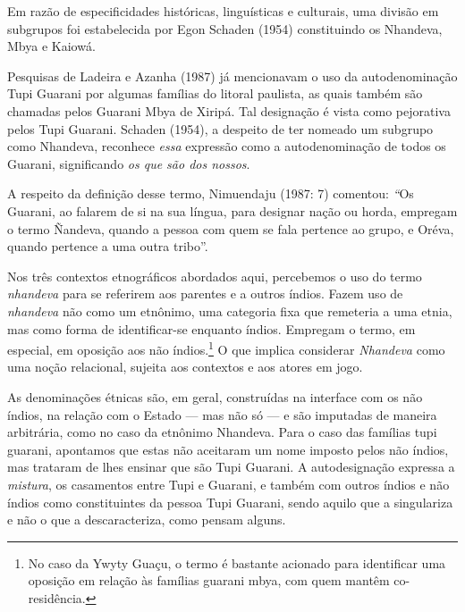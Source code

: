 Em razão de especificidades históricas, linguísticas e culturais, uma
divisão em subgrupos foi estabelecida por Egon Schaden (1954)
constituindo os Nhandeva, Mbya e Kaiowá.

Pesquisas de Ladeira e Azanha (1987) já mencionavam o uso da
autodenominação Tupi Guarani por algumas famílias do litoral paulista,
as quais também são chamadas pelos Guarani Mbya de Xiripá. Tal
designação é vista como pejorativa pelos Tupi Guarani. Schaden (1954), a
despeito de ter nomeado um subgrupo como Nhandeva, reconhece \emph{essa}
expressão como a autodenominação de todos os Guarani, significando
\emph{os que são dos nossos}.

A respeito da definição desse termo, Nimuendaju (1987: 7) comentou:
\emph{``}Os Guarani, ao falarem de si na sua língua, para designar nação
ou horda, empregam o termo Ñandeva, quando a pessoa com quem se fala
pertence ao grupo, e Oréva, quando pertence a uma outra tribo''.

Nos três contextos etnográficos abordados aqui, percebemos o uso do
termo \emph{nhandeva} para se referirem aos parentes e a outros índios.
Fazem uso de \emph{nhandeva} não como um etnônimo, uma categoria fixa
que remeteria a uma etnia, mas como forma de identificar-se enquanto
índios. Empregam o termo, em especial, em oposição aos não
índios.\footnote{No caso da Ywyty Guaçu, o termo é bastante acionado
  para identificar uma oposição em relação às famílias guarani mbya, com
  quem mantêm co-residência.} O que implica considerar \emph{Nhandeva}
como uma noção relacional, sujeita aos contextos e aos atores em jogo.

As denominações étnicas são, em geral, construídas na interface com os
não índios, na relação com o Estado --- mas não só --- e são imputadas
de maneira arbitrária, como no caso da etnônimo Nhandeva. Para o caso
das famílias tupi guarani, apontamos que estas não aceitaram um nome
imposto pelos não índios, mas trataram de lhes ensinar que são Tupi
Guarani. A autodesignação expressa a \emph{mistura}, os casamentos entre
Tupi e Guarani, e também com outros índios e não índios como
constituintes da pessoa Tupi Guarani, sendo aquilo que a singulariza e
não o que a descaracteriza, como pensam alguns.


